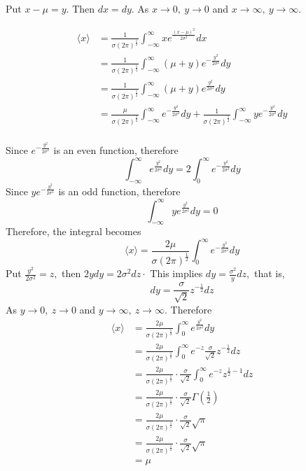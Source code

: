 Put $x-\mu=y .$ Then $d x=d y .$ As $x \rightarrow 0, \  y \rightarrow 0$ and $x \rightarrow \infty, \  y \rightarrow \infty$.

$$
\begin{aligned}
\langle x\rangle&=\frac{1}{\sigma(2 \pi)^{\frac{1}{2}}} \int_{-\infty}^{\infty} x e^{\frac{(x-\mu)^{2}}{2 \sigma^{2}}} d x \\
&=\frac{1}{\sigma(2 \pi)^{\frac{1}{2}}} \int_{-\infty}^{\infty}(\mu+y) e^{-\frac{y^{2}}{2 \sigma^{2}}} d y \\
&=\frac{1}{\sigma(2 \pi)^{\frac{1}{2}}} \int_{-\infty}^{\infty}(\mu+y) e^{\frac{y^{2}}{2 \sigma^{2}}} d y \\
&=\frac{\mu}{\sigma(2 \pi)^{\frac{1}{2}}} \int_{-\infty}^{\infty} e^{-\frac{y^{2}}{2 \sigma^{2}}} d y+\frac{1}{\sigma(2 \pi)^{\frac{1}{2}}} \int_{-\infty}^{\infty} y e^{-\frac{y^{2}}{2 \sigma^{2}}} d y \\
\end{aligned}
$$

Since $e^{-\frac{y^{2}}{2 \sigma^{2}}}$ is an even function, therefore 
$$\int_{-\infty}^{\infty} e^{\frac{y^{2}}{2 \sigma^{2}}} d y=2 \int_{0}^{\infty} e^{-\frac{y^{2}}{2 \sigma^{2}}} d y$$
Since $y e^{-\frac{y^{2}}{2 \sigma^{2}}}$ is an odd
function, therefore 
$$\int_{-\infty}^{\infty} y e^{\frac{y^{2}}{2 \sigma^{2}}} d y=0$$
Therefore, the integral becomes
$$
\langle x\rangle=\frac{2 \mu}{\sigma(2 \pi)^{\frac{1}{2}}} \int_{0}^{\infty} e^{-\frac{y^{2}}{2 \sigma^{2}}} d y
$$
Put $\frac{y^{2}}{2 \sigma^{2}}=z,$ then $2 y d y=2 \sigma^{2} d z \cdot$ This implies $d y=\frac{\sigma^{2}}{y} d z,$ that is, 
$$d y=\frac{\sigma}{\sqrt{2}} z^{-\frac{1}{2}} d z$$
As $y \rightarrow 0, \  z \rightarrow 0$ and $y \rightarrow \infty, \  z \rightarrow \infty$. Therefore
$$
\begin{aligned}
\langle x\rangle&=\frac{2 \mu}{\sigma(2 \pi)^{\frac{1}{2}}} \int_{0}^{\infty} e^{\frac{y^{2}}{2 \sigma^{2}}} d y \\
&=\frac{2 \mu}{\sigma(2 \pi)^{\frac{1}{2}}} \int_{0}^{\infty} e^{-z} \frac{\sigma}{\sqrt{2}} z^{-\frac{1}{2}} d z \\
&=\frac{2 \mu}{\sigma(2 \pi)^{\frac{1}{2}}} \cdot \frac{\sigma}{\sqrt{2}} \int_{0}^{\infty} e^{-z} z^{\frac{1}{2}-1} d z \\
&=\frac{2 \mu}{\sigma(2 \pi)^{\frac{1}{2}}} \cdot \frac{\sigma}{\sqrt{2}} \Gamma\left(\frac{1}{2}\right) \\
&=\frac{2 \mu}{\sigma(2 \pi)^{\frac{1}{2}}} \cdot \frac{\sigma}{\sqrt{2}} \sqrt{\pi} \\
&=\frac{2 \mu}{\sigma(2 \pi)^{\frac{1}{2}}} \cdot \frac{\sigma}{\sqrt{2}} \sqrt{\pi} \\
&=\mu \\
\end{aligned}
$$

